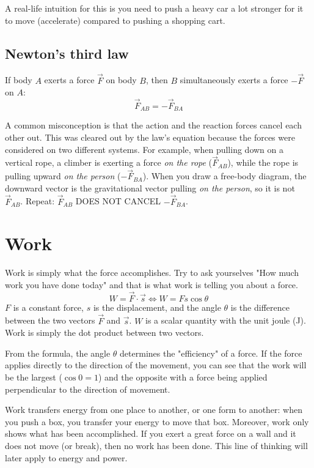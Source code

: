 A real-life intuition for this is you need to push a heavy car a lot stronger for it to move (accelerate) compared to pushing a shopping cart. 

\subsection{Newton's third law}
If body $A$ exerts a force $\vec{F}$ on body $B$, then $B$ simultaneously exerts a force $-\vec{F}$ on $A$:
\begin{equation}
    \vec{F}_{AB} = -\vec{F}_{BA}
\end{equation}

A common misconception is that the action and the reaction forces cancel each other out. This was cleared out by the law's equation because the forces were considered on two different systems. For example, when pulling down on a vertical rope, a climber is exerting a force \textit{on the rope} ($\vec{F}_{AB}$), while the rope is pulling upward \textit{on the person} ($-\vec{F}_{BA}$). When you draw a free-body diagram, the downward vector is the gravitational vector pulling \textit{on the person}, so it is not $\vec{F}_{AB}$. Repeat: $\vec{F}_{AB}$ DOES NOT CANCEL $-\vec{F}_{BA}$.

\section{Work}
Work is simply what the force accomplishes. Try to ask yourselves "How much work you have done today" and that is what work is telling you about a force.
\begin{equation}
    W = \vec{F} \cdot \vec{s}
    \iff
    W = Fs\cos{\theta}
\end{equation}
$F$ is a constant force, $s$ is the displacement, and the angle $\theta$ is the difference between the two vectors $\vec{F}$ and $\vec{s}$. $W$ is a scalar quantity with the unit joule (J). Work is simply the dot product between two vectors.

From the formula, the angle $\theta$ determines the "efficiency" of a force. If the force applies directly to the direction of the movement, you can see that the work will be the largest ($\cos0=1$) and the opposite with a force being applied perpendicular to the direction of movement.

Work transfers energy from one place to another, or one form to another: when you push a box, you transfer your energy to move that box. Moreover, work only shows what has been accomplished. If you exert a great force on a wall and it does not move (or break), then no work has been done. This line of thinking will later apply to energy and power.

